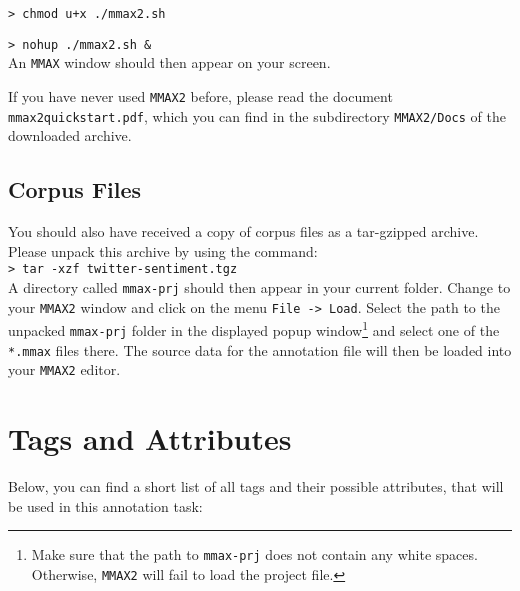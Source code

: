 \documentclass[11pt,a4paper]{article}
\begin{document}
\texttt{> chmod u+x ./mmax2.sh}

\texttt{> nohup ./mmax2.sh \&} \\\newline
       {\setlength{\parindent}{0pt}An \texttt{MMAX} window should then
         appear on your screen.}

If you have never used \texttt{MMAX2} before, please read the document
\texttt{mmax2quickstart.pdf}, which you can find in the subdirectory
\texttt{MMAX2/Docs} of the downloaded archive.

\subsection{Corpus Files}

You should also have received a copy of corpus files as a tar-gzipped
archive.  Please unpack this archive by using the command:\\\newline
\texttt{> tar -xzf twitter-sentiment.tgz}\\\newline
       {\setlength{\parindent}{0pt} A directory called
         \texttt{mmax-prj} should then appear in your current folder.
         Change to your \texttt{MMAX2} window and click on the menu
         \texttt{File -> Load}.  Select the path to the unpacked
         \texttt{mmax-prj} folder in the displayed popup
         window\footnote{Make sure that the path to \texttt{mmax-prj}
           does not contain any white spaces.  Otherwise,
           \texttt{MMAX2} will fail to load the project file.} and
         select one of the \texttt{*.mmax} files there.  The source
         data for the annotation file will then be loaded into your
         \texttt{MMAX2} editor.}


\section{Tags and Attributes}\label{sec:markables}
Below, you can find a short list of all tags and their possible
attributes, that will be used in this annotation task:
\end{document}
